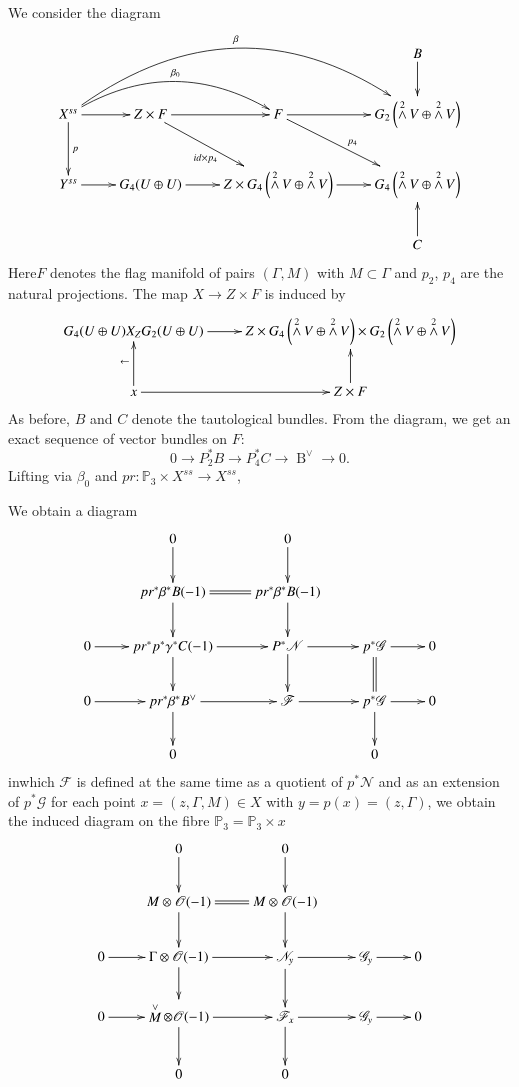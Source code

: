 We consider the diagram
$$
\xymatrix{
&& &\ar[d]B\\
X^{ss}\ar@/^2pc/[urrd]^-{\beta_0}\ar@/^4pc/[urrrd]^-{\beta} \ar[r]\ar[d]^{p}&Z\times F\ar[r]\ar[dr]_{id\times p_4}& F\ar[r]\ar[dr]^{p_{4}}& G_{2}\left(\displaystyle\mathop{\wedge}^{2} V\oplus \displaystyle\mathop{\wedge}^{2} V\right)\\ 
Y^{ss}\ar[r]& G_4(U\oplus U)\ar[r]& Z\times G_4\left(\displaystyle\mathop{\wedge}^{2} V\oplus \displaystyle\mathop{\wedge}^{2}V\right)\ar[r]& G_4\left(\displaystyle\mathop{\wedge}^{2}V\oplus \displaystyle\mathop{\wedge}^{2}V\right)\\
& & & \ar[u]C}
$$
Here\pageoriginale $F$ denotes the flag manifold of pairs $(\Gamma,
M)$ with $M\subset \Gamma$ and $p_2$, $p_4$ are the natural
projections. The map $X\to Z\times F$ is induced by 
$$
\xymatrix{G_4(U\oplus U) X_ZG_2(U\oplus U)\ar[r]& Z\times G_4\left(\displaystyle\mathop{\wedge}^{2} V\oplus \displaystyle\mathop{\wedge}^{2} V\right)\times G_2\left(\displaystyle\mathop{\wedge}^{2}V\oplus \displaystyle\mathop{\wedge}^{2}V\right)\\
x\ar[r]\ar[u]^{\leftarrow}& Z\times F\ar[u]}
$$
As before, $B$ and $C$ denote the tautological bundles. From the
diagram, we get an exact sequence of vector bundles on $F$: 
$$
0\to P^{\ast}_2 B\to P^{\ast}_4 C\to \displaystyle\mathop{B}^{\vee}\to 0.
$$
Lifting via $\beta_0$ and $pr:\mathbb{P}_3\times X^{ss}\to X^{ss}$, 

We obtain a diagram 
$$
\xymatrix{& 0\ar[d] & 0\ar[d]\\
&pr^{\ast}\beta^{\ast}B(-1)\ar@{=}[r]\ar[d]& pr^{\ast}\beta^{\ast}B(-1)\ar[d]\\
0\ar[r]& pr^{\ast}p^{\ast}\gamma^{\ast}C(-1)\ar[r]\ar[d]& P^{\ast}\mathscr{N}\ar[r]\ar[d]& p^{\ast}\mathscr{G}\ar[r]\ar@{=}[d]&0\\
0\ar[r]&pr^{\ast}\beta^{\ast}B^{\vee}\ar[r]\ar[d]& \mathscr{F}\ar[r]& p^{\ast}\mathscr{G}\ar[r]\ar[d]&0\\
& 0 & & 0\\
}
$$
in\pageoriginale which $\mathscr{F}$ is defined at the same time as a quotient of $p^{\ast}\mathscr{N}$ and as an extension of $p^{\ast}\mathscr{G}$ for each point $x=(z,\Gamma, M)\in X$ with $y=p(x)=(z,\Gamma)$, we obtain the induced diagram on the fibre $\mathbb{P}_3=\mathbb{P}_3\times x$
$$
\xymatrix{& 0\ar[d] &0\ar[d]\\
& M\otimes \mathscr{O}(-1)\ar@{=}[r]\ar[d]&M\otimes \mathscr{O}(-1)\ar[d]\\
0\ar[r]& \Gamma \otimes \mathscr{O}(-1)\ar[r]\ar[d]& \mathscr{N}_y\ar[r]\ar[d]& \mathscr{G}_y\ar[r] &0\\
0\ar[r]& \displaystyle\mathop{M}^{\vee}\otimes \mathscr{O}(-1)\ar[r]\ar[d]& \mathscr{F}_x\ar[r]\ar[d]& \mathscr{G}_y\ar[r]&0\\
&0&0}
$$

